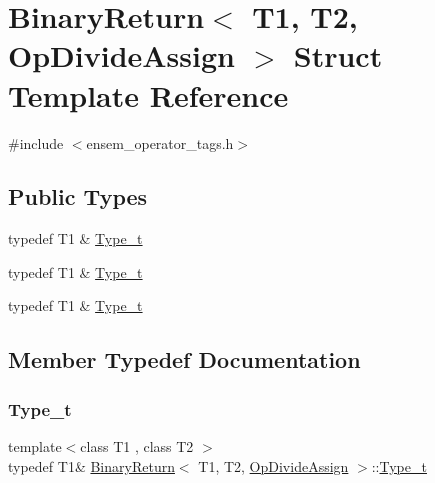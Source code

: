 \hypertarget{structBinaryReturn_3_01T1_00_01T2_00_01OpDivideAssign_01_4}{}\section{Binary\+Return$<$ T1, T2, Op\+Divide\+Assign $>$ Struct Template Reference}
\label{structBinaryReturn_3_01T1_00_01T2_00_01OpDivideAssign_01_4}


{\ttfamily \#include $<$ensem\+\_\+operator\+\_\+tags.\+h$>$}

\subsection*{Public Types}
\begin{DoxyCompactItemize}
\item 
typedef T1 \& \mbox{\hyperlink{structBinaryReturn_3_01T1_00_01T2_00_01OpDivideAssign_01_4_adc3c915034f321213a7e76979b881a0d}{Type\+\_\+t}}
\item 
typedef T1 \& \mbox{\hyperlink{structBinaryReturn_3_01T1_00_01T2_00_01OpDivideAssign_01_4_adc3c915034f321213a7e76979b881a0d}{Type\+\_\+t}}
\item 
typedef T1 \& \mbox{\hyperlink{structBinaryReturn_3_01T1_00_01T2_00_01OpDivideAssign_01_4_adc3c915034f321213a7e76979b881a0d}{Type\+\_\+t}}
\end{DoxyCompactItemize}


\subsection{Member Typedef Documentation}
\mbox{\label{structBinaryReturn_3_01T1_00_01T2_00_01OpDivideAssign_01_4_adc3c915034f321213a7e76979b881a0d}} 
\subsubsection{\texorpdfstring{Type\_t}{Type\_t}\hspace{0.1cm}{\footnotesize\ttfamily [1/3]}}
{\footnotesize\ttfamily template$<$class T1 , class T2 $>$ \\
typedef T1\& \mbox{\hyperlink{structBinaryReturn}{Binary\+Return}}$<$ T1, T2, \mbox{\hyperlink{structOpDivideAssign}{Op\+Divide\+Assign}} $>$\+::\mbox{\hyperlink{structBinaryReturn_3_01T1_00_01T2_00_01OpDivideAssign_01_4_adc3c915034f321213a7e76979b881a0d}{Type\+\_\+t}}}

